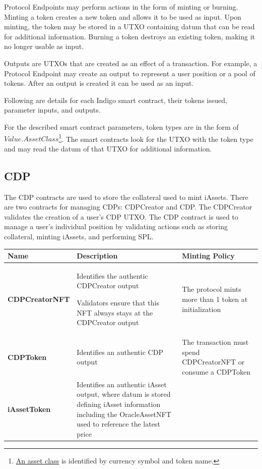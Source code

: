 \documentclass{article}
\begin{document}
\begin{sloppypar}
Protocol Endpoints may perform actions in the form of minting or
burning. Minting a token creates a new token and allows it to be used as
input. Upon minting, the token may be stored in a UTXO containing datum
that can be read for additional information. Burning a token destroys an
existing token, making it no longer usable as input.

Outputs are UTXOs that are created as an effect of a transaction. For
example, a Protocol Endpoint may create an output to represent a user
position or a pool of tokens. After an output is created it can be used
as an input.

Following are details for each Indigo smart contract, their tokens
issued, parameter inputs, and outputs.

For the described smart contract parameters, token types are in the form
of \(Value.AssetClass\)\footnote{\href{https://playground.plutus.iohkdev.io/doc/haddock/plutus-ledger-api/html/Plutus-V1-Ledger-Value.html\#g:3}{An
  asset class} is identified by currency symbol and token name.}. The
smart contracts look for the UTXO with the token type and may read the
datum of that UTXO for additional information.

\hypertarget{cdp}{%
\subsection{CDP}\label{cdp}}

The CDP contracts are used to store the collateral used to mint iAssets.
There are two contracts for managing CDPs: CDPCreator and CDP. The
CDPCreator validates the creation of a user's CDP UTXO. The CDP contract
is used to manage a user's individual position by validating actions
such as storing collateral, minting iAssets, and performing SPL.

\begin{tabularx}{\linewidth}{l|L|L}
\caption{CDP native tokens}
\tabularnewline
\toprule
\textbf{Name} & \textbf{Description} & \textbf{Minting
Policy}
\tabularnewline
\midrule
\endhead
\textbf{CDPCreatorNFT}
&
Identifies the authentic CDPCreator output

Validators ensure that this NFT always stays at the CDPCreator
output
&
The protocol mints more than 1 token at initialization
\tabularnewline
\midrule
\textbf{CDPToken} & Identifies an authentic CDP output & The transaction
must spend CDPCreatorNFT or consume a CDPToken
\tabularnewline
\midrule
\textbf{iAssetToken}
&
Identifies an authentic iAsset output, where datum is stored defining
iAsset information including the OracleAssetNFT used to reference the
latest price


\end{tabularx}
\end{sloppypar}
\end{document}
